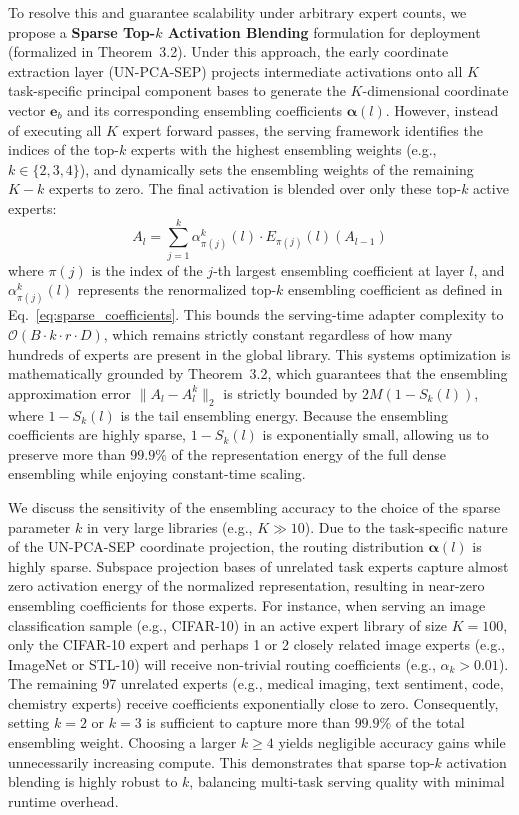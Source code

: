 To resolve this and guarantee scalability under arbitrary expert counts, we propose a \textbf{Sparse Top-$k$ Activation Blending} formulation for deployment (formalized in Theorem~3.2). Under this approach, the early coordinate extraction layer (UN-PCA-SEP) projects intermediate activations onto all $K$ task-specific principal component bases to generate the $K$-dimensional coordinate vector $\mathbf{e}_b$ and its corresponding ensembling coefficients $\boldsymbol{\alpha}(l)$. However, instead of executing all $K$ expert forward passes, the serving framework identifies the indices of the top-$k$ experts with the highest ensembling weights (e.g., $k \in \{2, 3, 4\}$), and dynamically sets the ensembling weights of the remaining $K-k$ experts to zero. The final activation is blended over only these top-$k$ active experts:
\begin{equation}
A_l = \sum_{j=1}^k \alpha^k_{\pi(j)}(l) \cdot E_{\pi(j)}(l)(A_{l-1})
\end{equation}
where $\pi(j)$ is the index of the $j$-th largest ensembling coefficient at layer $l$, and $\alpha^k_{\pi(j)}(l)$ represents the renormalized top-$k$ ensembling coefficient as defined in Eq.~\ref{eq:sparse_coefficients}. This bounds the serving-time adapter complexity to $\mathcal{O}(B \cdot k \cdot r \cdot D)$, which remains strictly constant regardless of how many hundreds of experts are present in the global library. This systems optimization is mathematically grounded by Theorem~3.2, which guarantees that the ensembling approximation error $\|A_l - A^k_l\|_2$ is strictly bounded by $2 M (1 - S_k(l))$, where $1 - S_k(l)$ is the tail ensembling energy. Because the ensembling coefficients are highly sparse, $1 - S_k(l)$ is exponentially small, allowing us to preserve more than $99.9\%$ of the representation energy of the full dense ensembling while enjoying constant-time scaling.

We discuss the sensitivity of the ensembling accuracy to the choice of the sparse parameter $k$ in very large libraries (e.g., $K \gg 10$). Due to the task-specific nature of the UN-PCA-SEP coordinate projection, the routing distribution $\boldsymbol{\alpha}(l)$ is highly sparse. Subspace projection bases of unrelated task experts capture almost zero activation energy of the normalized representation, resulting in near-zero ensembling coefficients for those experts. For instance, when serving an image classification sample (e.g., CIFAR-10) in an active expert library of size $K=100$, only the CIFAR-10 expert and perhaps 1 or 2 closely related image experts (e.g., ImageNet or STL-10) will receive non-trivial routing coefficients (e.g., $\alpha_k > 0.01$). The remaining 97 unrelated experts (e.g., medical imaging, text sentiment, code, chemistry experts) receive coefficients exponentially close to zero. Consequently, setting $k=2$ or $k=3$ is sufficient to capture more than $99.9\%$ of the total ensembling weight. Choosing a larger $k \ge 4$ yields negligible accuracy gains while unnecessarily increasing compute. This demonstrates that sparse top-$k$ activation blending is highly robust to $k$, balancing multi-task serving quality with minimal runtime overhead.

